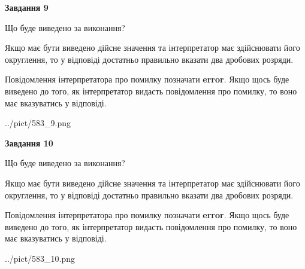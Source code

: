 \documentclass[12pt, ukrainian]{article}
\begin{document}
{\begin {Large}
{\begin {center}\textbf{Завдання 9}\end {center}}\par
Що буде виведено за виконання? \par

Якщо має бути виведено дійсне значення та інтерпретатор має здійснювати його округлення, 
то у відповіді достатньо правильно вказати два дробових розряди.

Повідомлення інтерпретатора про помилку позначати \textbf{error}.
Якщо щось буде виведено до того, як інтерпретатор видасть повідомлення про помилку, 
то воно має вказуватись у відповіді. \par

\begin{center}
	{../pict/583_9.png}
\end{center}
\newpage

{\begin {center}\textbf{Завдання 10}\end {center}}\par
Що буде виведено за виконання? \par

Якщо має бути виведено дійсне значення та інтерпретатор має здійснювати його округлення, 
то у відповіді достатньо правильно вказати два дробових розряди.

Повідомлення інтерпретатора про помилку позначати \textbf{error}.
Якщо щось буде виведено до того, як інтерпретатор видасть повідомлення про помилку, 
то воно має вказуватись у відповіді. \par

\begin{center}
	{../pict/583_10.png}
\end{center}
\newpage

\end {Large}}
\end{document}
